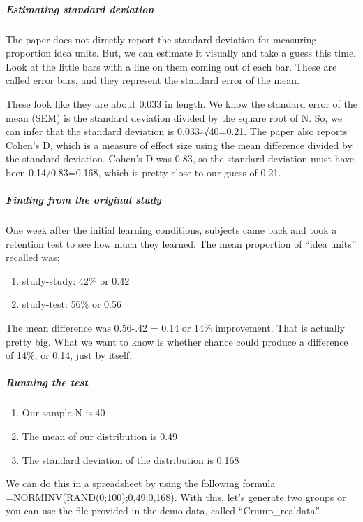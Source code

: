 \documentclass[
]{book}
\begin{document}
\hypertarget{estimating-standard-deviation}{%
\subparagraph{Estimating standard deviation}\label{estimating-standard-deviation}}

The paper does not directly report the standard deviation for measuring proportion idea units. But, we can estimate it visually and take a guess this time. Look at the little bars with a line on them coming out of each bar. These are called error bars, and they represent the standard error of the mean.

These look like they are about 0.033 in length. We know the standard error of the mean (SEM) is the standard deviation divided by the square root of N. So, we can infer that the standard deviation is 0.033∗√40=0.21. The paper also reports Cohen's D, which is a measure of effect size using the mean difference divided by the standard deviation. Cohen's D was 0.83, so the standard deviation must have been 0.14/0.83=0.168, which is pretty close to our guess of 0.21.

\hypertarget{finding-from-the-original-study}{%
\subparagraph{Finding from the original study}\label{finding-from-the-original-study}}

One week after the initial learning conditions, subjects came back and took a retention test to see how much they learned. The mean proportion of ``idea units'' recalled was:

\begin{enumerate}
\def\labelenumi{\arabic{enumi}.}
\item
  study-study: 42\% or 0.42
\item
  study-test: 56\% or 0.56
\end{enumerate}

The mean difference was 0.56-.42 = 0.14 or 14\% improvement. That is actually pretty big. What we want to know is whether chance could produce a difference of 14\%, or 0.14, just by itself.

\hypertarget{running-the-test}{%
\subparagraph{Running the test}\label{running-the-test}}

\begin{enumerate}
\def\labelenumi{\arabic{enumi}.}
\item
  Our sample N is 40
\item
  The mean of our distribution is 0.49
\item
  The standard deviation of the distribution is 0.168
\end{enumerate}

We can do this in a spreadsheet by using the following formula =NORMINV(RAND(0;100);0,49;0,168). With this, let's generate two groups or you can use the file provided in the demo data, called ``Crump\_realdata''.
\end{document}
